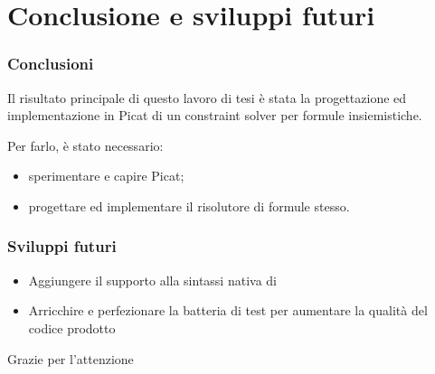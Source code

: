 \documentclass{beamer}
\begin{document}
\section{Conclusione e sviluppi futuri}

\begin{frame}
  \frametitle{Conclusioni} Il risultato principale di questo lavoro di
  tesi è stata la progettazione ed implementazione in Picat di un
  constraint solver per formule insiemistiche.
  
  \bigskip
  
  Per farlo, è stato necessario:
  \begin{itemize}
  \item sperimentare e capire Picat;
  \item progettare ed implementare il risolutore di formule stesso.
  \end{itemize}
\end{frame}


\begin{frame}
  \frametitle{Sviluppi futuri}
  \begin{itemize}
  \item Aggiungere il supporto alla sintassi nativa di \lset{}
  \item Arricchire e perfezionare la batteria di test per aumentare la
    qualità del codice prodotto
  \end{itemize}
\end{frame}


\begin{frame}
  \Huge{\centerline{Grazie per l'attenzione}}
\end{frame}

\end{document}
